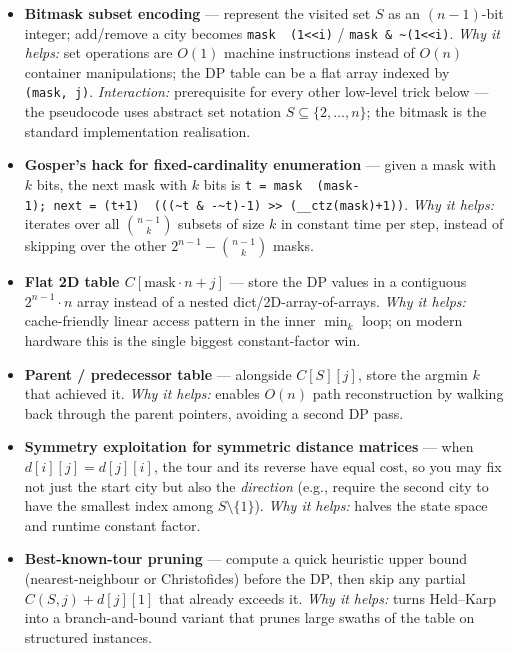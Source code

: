 \documentclass[11pt]{article}
\begin{document}
\begin{itemize}
\item
  \label{trick-1-3-1}\textbf{Bitmask subset encoding} ---
  represent the visited set \(S\) as an \((n{-}1)\)-bit integer;
  add/remove a city becomes
  \texttt{mask\ \textbar{}\ (1\textless{}\textless{}i)} /
  \texttt{mask\ \&\ \textasciitilde{}(1\textless{}\textless{}i)}.
  \emph{Why it helps:} set operations are \(O(1)\) machine instructions
  instead of \(O(n)\) container manipulations; the DP table can be a
  flat array indexed by \texttt{(mask,\ j)}. \emph{Interaction:}
  prerequisite for every other low-level trick below --- the pseudocode
  uses abstract set notation \(S\subseteq\{2,\ldots,n\}\); the bitmask
  is the standard implementation realisation.
\item
  \label{trick-1-3-2}\textbf{Gosper's hack for
  fixed-cardinality enumeration} --- given a mask with \(k\) bits, the
  next mask with \(k\) bits is
  \texttt{t\ =\ mask\ \textbar{}\ (mask-1);\ next\ =\ (t+1)\ \textbar{}\ (((\textasciitilde{}t\ \&\ -\textasciitilde{}t)-1)\ \textgreater{}\textgreater{}\ (\_\_ctz(mask)+1))}.
  \emph{Why it helps:} iterates over all \(\binom{n-1}{k}\) subsets of
  size \(k\) in constant time per step, instead of skipping over the
  other \(2^{n-1}-\binom{n-1}{k}\) masks.
\item
  \label{trick-1-3-3}\textbf{Flat 2D table
  \(C[\text{mask} \cdot n + j]\)} --- store the DP values in a
  contiguous \(2^{n-1}\cdot n\) array instead of a nested
  dict/2D-array-of-arrays. \emph{Why it helps:} cache-friendly linear
  access pattern in the inner \(\min_k\) loop; on modern hardware this
  is the single biggest constant-factor win.
\item
  \label{trick-1-3-4}\textbf{Parent / predecessor table}
  --- alongside \(C[S][j]\), store the argmin \(k\) that achieved it.
  \emph{Why it helps:} enables \(O(n)\) path reconstruction by walking
  back through the parent pointers, avoiding a second DP pass.
\item
  \label{trick-1-3-5}\textbf{Symmetry exploitation for
  symmetric distance matrices} --- when \(d[i][j]=d[j][i]\), the tour
  and its reverse have equal cost, so you may fix not just the start
  city but also the \emph{direction} (e.g., require the second city to
  have the smallest index among \(S\setminus\{1\}\)). \emph{Why it
  helps:} halves the state space and runtime constant factor.
\item
  \label{trick-1-3-6}\textbf{Best-known-tour pruning} ---
  compute a quick heuristic upper bound (nearest-neighbour or
  Christofides) before the DP, then skip any partial \(C(S,j)+d[j][1]\)
  that already exceeds it. \emph{Why it helps:} turns Held--Karp into a
  branch-and-bound variant that prunes large swaths of the table on
  structured instances.
\end{itemize}
\end{document}
